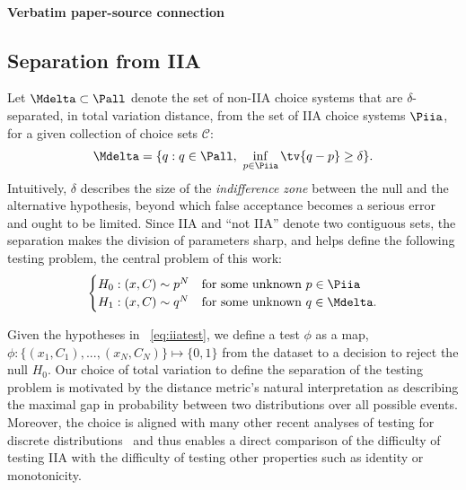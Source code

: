 \documentclass[10pt]{article}
\begin{document}
\paragraph{Verbatim paper-source connection}
\begin{ReviewVerbatim}
\subsection{Separation from IIA}

	Let $\Mdelta \subset \Pall$ denote the set of non-IIA choice systems that are $\delta$-separated, in total variation distance, from the set of IIA choice systems $\Piia$, for a given collection of choice sets $\mathcal C$:
	\begin{align}
	\Mdelta = \{q : q \in \Pall, \ \inf_{p \in \Piia} \tv{q-p} \geq \delta\}.
	\end{align}
	Intuitively, $\delta$ describes the size of the \textit{indifference zone} \cite{lehmann2005testing} between the null and the alternative hypothesis, beyond which false acceptance becomes a serious error and ought to be limited. Since IIA and ``not IIA'' denote two contiguous sets, the separation makes the division of parameters sharp, and helps define the following testing problem, the central problem of this work:
	\begin{align}
	\label{eq:iiatest}
	\begin{cases}
	H_0: (x, C) \sim p^N & \text{for some unknown } p \in \Piia \\
	H_1: (x,C) \sim q^N & \text{for some unknown } q \in \Mdelta.
	\end{cases}
	\end{align}

	Given the hypotheses in ~\eqref{eq:iiatest}, we define a test $\phi$ as a map, $\phi : \{ (x_1,C_1),...,(x_N,C_N) \} \mapsto \{0,1\}$ from the dataset to a decision to reject the null $H_0$. Our choice of total variation to define the separation of the testing problem is motivated by the distance metric's natural interpretation as describing the maximal gap in probability between two distributions over all possible events. Moreover, the choice is aligned with many other recent analyses of testing for discrete distributions~\cite{paninski2008coincidence,wei2016sharp,valiant2017automatic} and thus enables a direct comparison of the difficulty of testing IIA with the difficulty of testing other properties such as identity or monotonicity.


\end{ReviewVerbatim}
\end{document}
